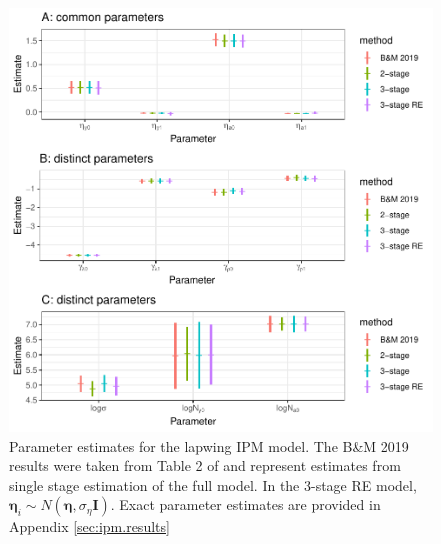 \documentclass[12pt]{article}
\newcommand{\bn}{\boldsymbol{\eta}}
\newcommand{\bI}{\mathbf{I}}
\begin{document}
\clearpage

\begin{figure}
\includegraphics[width=6.5in]{effects_all} 
\caption{\label{fig:ipm} Parameter estimates for the lapwing IPM model. The B\&M 2019 results were taken from Table 2 of \citet{besbeas2019exact} and represent estimates from single stage estimation of the full model. In the 3-stage RE model, $\bn_i \sim N(\bn,\sigma_{\eta}\bI)$. Exact parameter estimates are provided in Appendix \ref{sec:ipm.results}}
\end{figure}


\clearpage
\end{document}
